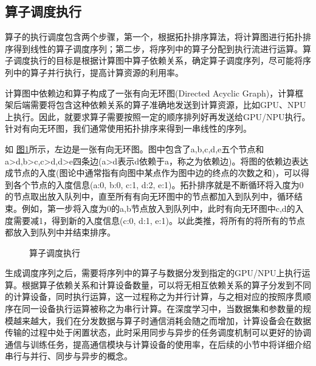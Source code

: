 \documentclass[letterpaper,10pt,english]{sphinxmanual}
\let\sphinxpxdimen\pdfpxdimen\else\newdimen\sphinxpxdimen
\begin{document}
\subsection{算子调度执行}
\label{\detokenize{chapter_computational_graph/schedule_of_computational_graph:id2}}
\sphinxAtStartPar
算子的执行调度包含两个步骤，第一个，根据拓扑排序算法，将计算图进行拓扑排序得到线性的算子调度序列；第二步，将序列中的算子分配到执行流进行运算。算子调度执行的目标是根据计算图中算子依赖关系，确定算子调度序列，尽可能将序列中的算子并行执行，提高计算资源的利用率。

\sphinxAtStartPar
计算图中依赖边和算子构成了一张有向无环图(Directed Acyclic
Graph)，计算框架后端需要将包含这种依赖关系的算子准确地发送到计算资源，比如GPU、NPU上执行。因此，就要求算子需要按照一定的顺序排列好再发送给GPU/NPU执行。针对有向无环图，我们通常使用拓扑排序来得到一串线性的序列。

\sphinxAtStartPar
如
\hyperref[\detokenize{chapter_computational_graph/schedule_of_computational_graph:schedule}]{图\ref{\detokenize{chapter_computational_graph/schedule_of_computational_graph:schedule}}}所示，左边是一张有向无环图。图中包含了a,b,c,d,e五个节点和a\sphinxhyphen{}>d,b\sphinxhyphen{}>c,c\sphinxhyphen{}>d,d\sphinxhyphen{}>e四条边(a\sphinxhyphen{}>d表示d依赖于a，称之为依赖边)。将图的依赖边表达成节点的入度(图论中通常指有向图中某点作为图中边的终点的次数之和)，可以得到各个节点的入度信息(a:0,
b:0, c:1, d:2,
e:1)。拓扑排序就是不断循环将入度为0的节点取出放入队列中，直至所有有向无环图中的节点都加入到队列中，循环结束。例如，第一步将入度为0的a,b节点放入到队列中，此时有向无环图中c,d的入度需要减1，得到新的入度信息(c:0,
d:1, e:1)。以此类推，将所有的将所有的节点都放入到队列中并结束排序。

\begin{figure}[H]
\centering
\capstart

\noindent\sphinxincludegraphics[width=700\sphinxpxdimen]{{schedule}.svg}
\caption{算子调度执行}\label{\detokenize{chapter_computational_graph/schedule_of_computational_graph:id5}}\label{\detokenize{chapter_computational_graph/schedule_of_computational_graph:schedule}}\end{figure}

\sphinxAtStartPar
生成调度序列之后，需要将序列中的算子与数据分发到指定的GPU/NPU上执行运算。根据算子依赖关系和计算设备数量，可以将无相互依赖关系的算子分发到不同的计算设备，同时执行运算，这一过程称之为并行计算，与之相对应的按照序贯顺序在同一设备执行运算被称之为串行计算。在深度学习中，当数据集和参数量的规模越来越大，我们在分发数据与算子时通信消耗会随之而增加，计算设备会在数据传输的过程中处于闲置状态，此时采用同步与异步的任务调度机制可以更好的协调通信与训练任务，提高通信模块与计算设备的使用率，在后续的小节中将详细介绍串行与并行、同步与异步的概念。
\end{document}
